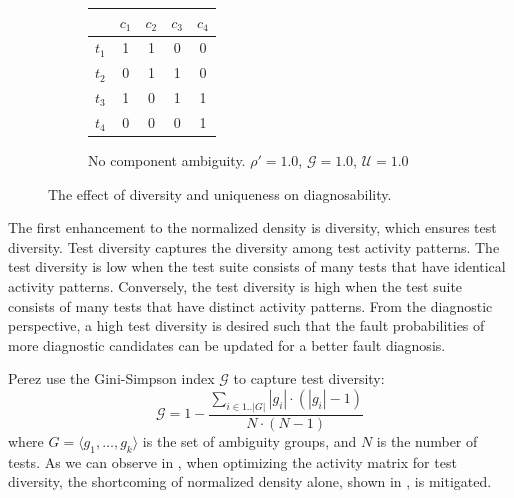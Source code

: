 \documentclass[twoside,a4paper,11pt]{memoir}
\begin{document}
\begin{figure}
\begin{subfigure}[b]{0.49\linewidth}
        \label{subfig:ambiguity}
    \end{subfigure}
    \hfill
    \begin{subfigure}[b]{0.49\linewidth}
        \centering
        \begin{tabular}{c|cccc}
          & $c_1$ & $c_2$ & $c_3$ & $c_4$     \\ \hline
          $t_1$ & 1 & 1 & 0 & 0 \\
          $t_2$ & 0 & 1 & 1 & 0 \\
          $t_3$ & 1 & 0 & 1 & 1 \\
          $t_4$ & 0 & 0 & 0 & 1 \\
        \end{tabular}
        \caption{No component ambiguity. $\rho' = 1.0$, $\mathcal{G}=1.0$, $\mathcal{U}=1.0$}
        \label{subfig:no_ambiguity}
    \end{subfigure}
    \caption{The effect of diversity and uniqueness on diagnosability.}
    \label{fig:diversity_ambiguity}
\end{figure}

The first enhancement to the normalized density is diversity, which ensures test diversity.
Test diversity captures the diversity among test activity patterns.
The test diversity is low when the test suite consists of many tests that have identical activity patterns.
Conversely, the test diversity is high when the test suite consists of many tests that have distinct activity patterns.
From the diagnostic perspective, a high test diversity is desired such that the fault probabilities of more diagnostic candidates can be updated for a better fault diagnosis.

Perez \etal use the Gini-Simpson index $\mathcal{G}$ \cite{OIK:OIK14714} to capture test diversity:
\begin{equation}
  \mathcal{G} = 1 - \frac{\sum_{i \in 1..|G|} |g_i| \cdot (|g_i| - 1)}{N \cdot (N - 1)}
\end{equation}
where $G = \langle g_1, \dots, g_k \rangle$ is the set of ambiguity groups, and $N$ is the number of tests.
As we can observe in , when optimizing the activity matrix for test diversity, the shortcoming of normalized density alone, shown in , is mitigated.
\end{document}
